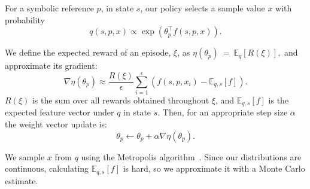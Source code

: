 For a symbolic reference $p$, in state $s$, our policy selects a
sample value $x$ with probability
$$q(s, p, x) \propto \exp(\theta_{p}^{\top} f(s, p, x)).$$

We define the expected reward of an episode, $\xi$, as
$\eta(\theta_{p})~=~\mathbb{E}_{q}[R(\xi)],$ and approximate its
gradient:
$$\nabla \eta(\theta_{p}) \approx \frac{R(\xi)}{\epsilon}
\sum_{i=1}^{\epsilon}(f(s, p, x_{i}) - \mathbb{E}_{q,s}[f]).$$
$R(\xi)$ is the sum over all rewards obtained throughout $\xi$, and
$\mathbb{E}_{q,s}[f]$ is the expected feature vector under $q$ in
state $s$. Then, for an appropriate step size $\alpha$ the weight
vector update is:
$$\theta_{p} \leftarrow \theta_{p} + \alpha \nabla \eta(\theta_{p}).$$

We sample $x$ from $q$ using the Metropolis algorithm~\cite{chib1995understanding}.
Since our distributions are continuous, calculating $\mathbb{E}_{q,s}[f]$ is hard,
so we approximate it with a Monte Carlo estimate.
